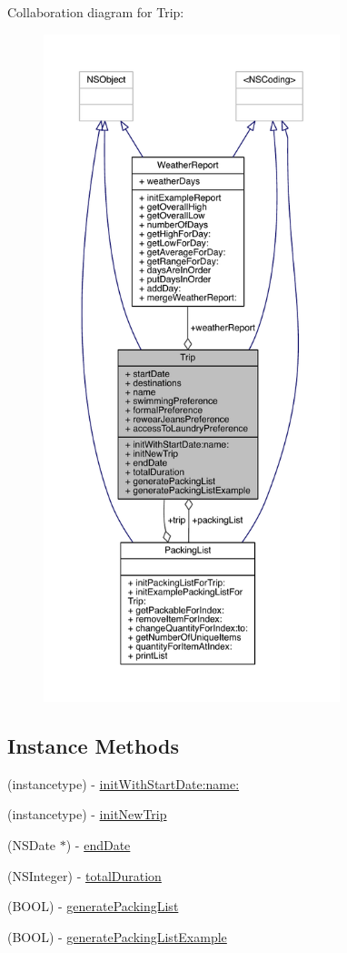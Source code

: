 Collaboration diagram for Trip\-:
\nopagebreak
\begin{figure}[H]
\begin{center}
\leavevmode
\includegraphics[height=550pt]{interface_trip__coll__graph}
\end{center}
\end{figure}
\subsection*{Instance Methods}
\begin{DoxyCompactItemize}
\item 
(instancetype) -\/ \hyperlink{interface_trip_aca341893b609059158a3c2809d5fd157}{init\-With\-Start\-Date\-:name\-:}
\item 
(instancetype) -\/ \hyperlink{interface_trip_ab712f4d482a0a2818038069998aea9aa}{init\-New\-Trip}
\item 
(N\-S\-Date $\ast$) -\/ \hyperlink{interface_trip_af45eceb7475c6e48bf48641deb44baf4}{end\-Date}
\item 
(N\-S\-Integer) -\/ \hyperlink{interface_trip_a7d4e8ffcab800bda331f75625eb2c6d3}{total\-Duration}
\item 
(B\-O\-O\-L) -\/ \hyperlink{interface_trip_a90808fe2b7874349bf0a5fc5a09acf3e}{generate\-Packing\-List}
\item 
(B\-O\-O\-L) -\/ \hyperlink{interface_trip_a078c437bbefc9fe136a03093fd549b10}{generate\-Packing\-List\-Example}
\end{DoxyCompactItemize}
